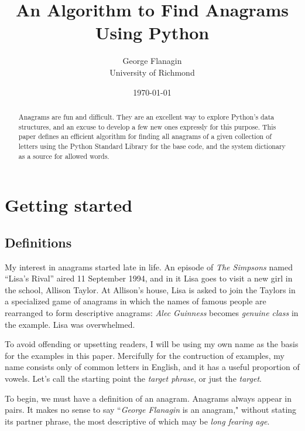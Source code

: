 \documentclass[letterpaper, 11pt]{article}
\title{An Algorithm to Find Anagrams Using Python}
\author{George Flanagin\\University of Richmond\\\lit{gflanagin@richmond.edu}}
\date{\today}
\begin{document}
\maketitle
\begin{abstract}
Anagrams are fun and difficult. They are an excellent way to explore
Python's data structures, and an excuse to develop a few new ones
expressly for this purpose. This paper defines an efficient algorithm
for finding all anagrams of a given collection of letters using the
Python Standard Library for the base code, and the system dictionary
as a source for allowed words.

\end{abstract}

\tableofcontents
\listoffigures

\newpage
\pagewiselinenumbers
\section{Getting started}

\subsection{Definitions}
My interest in anagrams started late in life. An episode of
\emph{The Simpsons} named ``Lisa's Rival'' aired 11 September 1994,
and in it Lisa goes to visit a new girl in the school, Allison
Taylor. At Allison's house, Lisa is asked to join the Taylors in a
specialized game of anagrams in which the names of famous people
are rearranged to form descriptive anagrams: \emph{Alec Guinness}
becomes \emph{genuine class} in the example.  Lisa was overwhelmed.

To avoid offending or upsetting readers, I will be using my own
name as the basis for the examples in this paper. Mercifully for
the contruction of examples, my name consists only of common letters
in English, and it has a useful proportion of vowels. Let's call
the starting point the \emph{target phrase}, or just the \emph{target}.

To begin, we must have a definition of an anagram. Anagrams
always appear in pairs.  It makes no sense to say ``\emph{George
Flanagin} is an anagram," without stating its partner phrase, the
most descriptive of which may be \emph{long fearing age}. 
\end{document}
